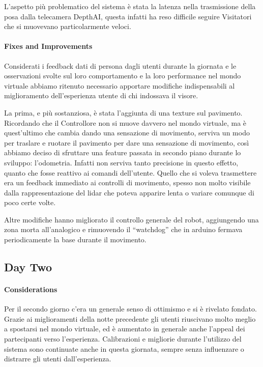 \documentclass{Configuration_Files/PoliMi3i_thesis}
\begin{document}
L’aspetto più problematico del sistema è stata la latenza nella trasmissione della posa dalla telecamera DepthAI, questa infatti ha reso difficile seguire Visitatori che si muovevano particolarmente veloci.

\paragraph{Fixes and Improvements}

Considerati i feedback dati di persona dagli utenti durante la giornata e le osservazioni svolte sul loro comportamento e la loro performance nel mondo virtuale abbiamo ritenuto necessario apportare modifiche indispensabili al miglioramento dell’esperienza utente di chi indossava il visore.

La prima, e più sostanziosa, è stata l’aggiunta di una texture sul pavimento. Ricordando che il Controllore non si muove davvero nel mondo virtuale, ma è quest’ultimo che cambia dando una sensazione di movimento, serviva un modo per traslare e ruotare il pavimento per dare una sensazione di movimento, così abbiamo deciso di sfruttare una feature passata in secondo piano durante lo sviluppo: l’odometria. Infatti non serviva tanto precisione in questo effetto, quanto che fosse reattivo ai comandi dell’utente. Quello che si voleva trasmettere era un feedback immediato ai controlli di movimento, spesso non molto visibile dalla rappresentazione del lidar che poteva apparire lenta o variare comunque di poco certe volte.

Altre modifiche hanno migliorato il controllo generale del robot, aggiungendo una zona morta all’analogico e rimuovendo il “watchdog” che in arduino fermava periodicamente la base durante il movimento.

\subsection{Day Two}

\paragraph{Considerations}

Per il secondo giorno c’era un generale senso di ottimismo e si è rivelato fondato. Grazie ai miglioramenti della notte precedente gli utenti riuscivano molto meglio a spostarsi nel mondo virtuale, ed è aumentato in generale anche l’appeal dei partecipanti verso l’esperienza. Calibrazioni e migliorie durante l’utilizzo del sistema sono continuate anche in questa giornata, sempre senza influenzare o distrarre gli utenti dall’esperienza.
\end{document}
